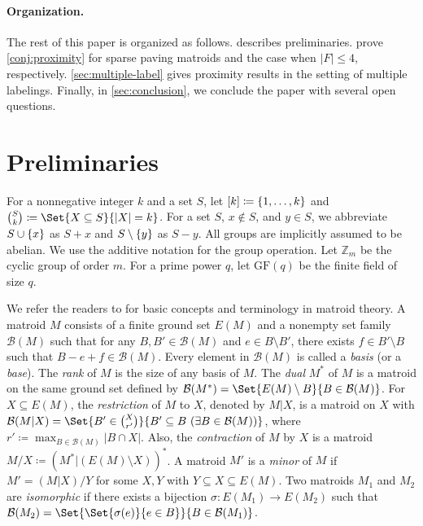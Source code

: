 \documentclass{article}
\DeclarePairedDelimiter{\set}{\{}{\}}
\theoremstyle{definition}
\newcommand{\GF}{\mathrm{GF}}
\newcommand{\Z}{\mathbb{Z}}
\begin{document}
\paragraph{Organization.}
The rest of this paper is organized as follows.
 describes preliminaries.
 prove \cref{conj:proximity} for sparse paving matroids and the case when $|F| \le 4$, respectively.
\cref{sec:multiple-label} gives proximity results in the setting of multiple labelings.
Finally, in \cref{sec:conclusion}, we conclude the paper with several open questions.

\section{Preliminaries}\label{sec:preliminaries}

For a nonnegative integer $k$ and a set $S$, let $[k] \coloneqq \set{1, \dotsc, k}$ and $\binom{S}{k} \coloneqq \Set{X \subseteq S}{|X| = k}$.
For a set $S$, $x \notin S$, and $y \in S$, we abbreviate $S \cup \set{x}$ as $S + x$ and $S \setminus \set{y}$ as $S - y$.
All groups are implicitly assumed to be abelian.
We use the additive notation for the group operation.
Let $\Z_m$ be the cyclic group of order $m$.
For a prime power $q$, let $\GF(q)$ be the finite field of size $q$.


We refer the readers to \cite{oxley2011matroid} for basic concepts and terminology in matroid theory. 
A matroid $M$ consists of a finite ground set $E(M)$ and a nonempty set family $\mathcal{B}(M)$ such that for any $B, B' \in \mathcal{B}(M)$ and $e \in B \setminus B'$, there exists $f \in B' \setminus B$ such that $B - e + f \in \mathcal{B}(M)$.
Every element in $\mathcal{B}(M)$ is called a \emph{basis} (or a \emph{base}).
The \emph{rank} of $M$ is the size of any basis of $M$. 
The \emph{dual} $M^*$ of $M$ is a matroid on the same ground set defined by $\mathcal{B}(M^*) = \Set{E(M) \setminus B}{B \in \mathcal{B}(M)}$.
For $X \subseteq E(M)$, the \emph{restriction} of $M$ to $X$, denoted by $M|X$, is a matroid on $X$ with $\mathcal{B}(M|X) = \Set{B' \in \binom{X}{r'}}{B' \subseteq B \ (\exists B \in \mathcal{B}(M))}$, where $r' \coloneqq \max_{B \in \mathcal{B}(M)} |B \cap X|$.
Also, the \emph{contraction} of $M$ by $X$ is a matroid $M/X \coloneqq (M^* | (E(M) \setminus X))^*$.
A matroid $M'$ is a \emph{minor} of $M$ if $M' = (M|X) / Y$ for some $X, Y$ with $Y \subseteq X \subseteq E(M)$.
Two matroids $M_1$ and $M_2$ are \emph{isomorphic} if there exists a bijection $\sigma \colon E(M_1) \to E(M_2)$ such that $\mathcal{B}(M_2) = \Set{\Set{\sigma(e)}{e \in B}}{B \in \mathcal{B}(M_1)}$.
\end{document}
